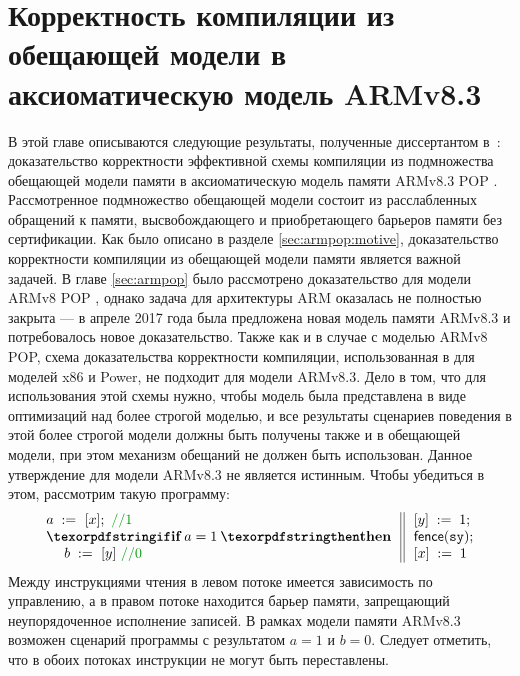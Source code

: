 \chapter{Корректность компиляции из обещающей модели в аксиоматическую модель ARMv8.3} \label{sec:armv83}
В этой главе описываются следующие результаты, полученные диссертантом
в~\cite{Podkopaev-al:NTV17,Podkopaev-al:ISPRAS17}:
доказательство корректности эффективной схемы компиляции из
подмножества обещающей модели памяти \cite{Kang-al:POPL17} в аксиоматическую
модель памяти ARMv8.3 POP \cite{Pulte-al:POPL18}.
Рассмотренное подмножество обещающей модели состоит из расслабленных обращений к памяти,
высвобождающего и приобретающего барьеров памяти без сертификации.
Как было описано в разделе \ref{sec:armpop:motive}, доказательство корректности
компиляции из обещающей модели памяти является важной задачей. 
В главе \ref{sec:armpop} было рассмотрено доказательство для модели ARMv8 POP \cite{Flur-al:POPL16},
однако задача для архитектуры ARM оказалась не полностью закрыта --- 
в апреле 2017 года была предложена новая модель памяти ARMv8.3 \cite{ARMv82,Pulte-al:POPL18} и потребовалось новое доказательство. 
Также как и в случае с моделью ARMv8 POP, схема доказательства корректности компиляции,
использованная в \cite{Kang-al:POPL17} для моделей x86 и Power, не подходит для модели ARMv8.3.
Дело в том, что для использования этой схемы нужно, чтобы модель была представлена в виде оптимизаций над более строгой
моделью, и все результаты сценариев поведения в этой более строгой модели должны быть получены также и в обещающей модели, при этом 
механизм обещаний не должен быть использован.
Данное утверждение для модели ARMv8.3 не является истинным.
Чтобы убедиться в этом, рассмотрим такую программу:
\[\inarrII{
\readInst{a}{x}; ~\valuecom{1} \\
\itne{a=1}{\readInst{b}{y} ~\valuecom{0}} 
}
{
\writeInst{y}{1}; \\
\fenceInst{\SY}; \\
\writeInst{x}{1}
}\]
Между инструкциями чтения в левом потоке имеется  зависимость по управлению, а в правом потоке находится барьер памяти, запрещающий неупорядоченное  исполнение записей.
В рамках модели памяти ARMv8.3 возможен сценарий программы с результатом $a = 1$ и $b = 0$. Следует отметить, 
что в обоих потоках инструкции не могут быть переставлены. 
